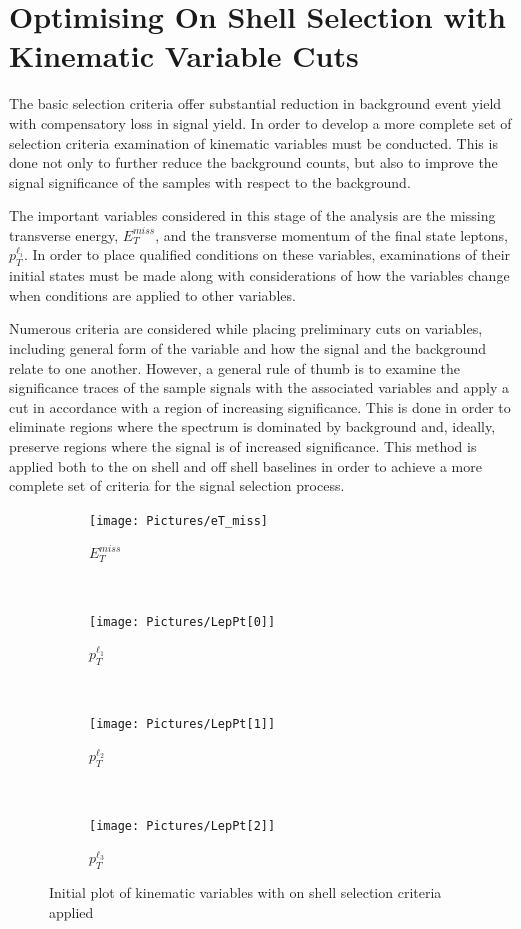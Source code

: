 \section{Optimising On Shell Selection with Kinematic Variable Cuts} \label{sec:OnShellOpt}
The basic selection criteria offer substantial reduction in background event yield with compensatory loss in signal yield.
In order to develop a more complete set of selection criteria examination of kinematic variables must be conducted.
This is done not only to further reduce the background counts, but also to improve the signal significance of the samples with respect to the background.

The important variables considered in this stage of the analysis are the missing transverse energy, $E_{T}^{miss}$, and the transverse momentum of the final state leptons, $p_{T}^{\ell_{i}}$.
In order to place qualified conditions on these variables, examinations of their initial states must be made along with considerations of how the variables change when conditions are applied to other variables.

Numerous criteria are considered while placing preliminary cuts on variables, including general form of the variable and how the signal and the background relate to one another.
However, a general rule of thumb is to examine the significance traces of the sample signals with the associated variables and apply a cut in accordance with a region of increasing significance.
This is done in order to eliminate regions where the spectrum is dominated by background and, ideally, preserve regions where the signal is of increased significance. 
This method is applied both to the on shell and off shell baselines in order to achieve a more complete set of criteria for the signal selection process.  

\begin{figure}[H]
    \centering
    \begin{subfigure}[b]{0.48\textwidth}
        \centering
        \texttt{[image: Pictures/eT\_miss]}
    \caption{$E_{T}^{miss}$}
    \end{subfigure}
    ~
    \begin{subfigure}[b]{0.48\textwidth}
        \centering
        \texttt{[image: Pictures/LepPt[0]]}
    \caption{$p_{T}^{\ell_{1}}$}    
        \end{subfigure}
    ~
    \centering
    \begin{subfigure}[b]{0.48\textwidth}
        \centering
        \texttt{[image: Pictures/LepPt[1]]}
    \caption{$p_{T}^{\ell_{2}}$}
    \end{subfigure}
    ~
    \begin{subfigure}[b]{0.48\textwidth}
        \centering
        \texttt{[image: Pictures/LepPt[2]]}
    \caption{$p_{T}^{\ell_{3}}$}    
        \end{subfigure}
\caption{Initial plot of kinematic variables with on shell selection criteria applied}
\label{fig:initialKinematics}
\end{figure}

